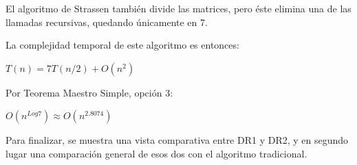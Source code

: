 \documentclass[12pt]{report}
\begin{document}
  El algoritmo de Strassen también divide las matrices, pero éste elimina una de las llamadas recursivas, quedando únicamente en 7.
  
  La complejidad temporal de este algoritmo es entonces:
  
  \begin{center}
      $ T(n) = 7T(n/2) +  O(n^2) $
  \end{center}

  
  Por Teorema Maestro Simple, opción 3:
  
  \begin{center}
    $ O(n^{Log7}) \approx O(n^{2.8074}) $
  \end{center}
  
  \centering

  Para finalizar, se muestra una vista comparativa entre DR1 y DR2, y en segundo lugar una comparación general de esos dos con el algoritmo tradicional.

  \centering
    
\end{document}
